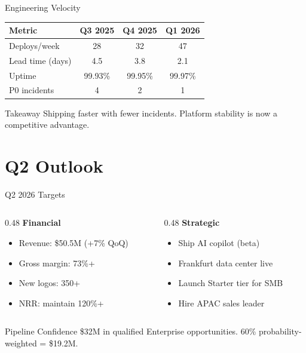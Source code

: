 \documentclass[aspectratio=169,11pt]{beamer}
\begin{document}
\begin{frame}{Engineering Velocity}
    \centering
    \begin{tabular}{l c c c}
        \toprule
        \textbf{Metric} & \textbf{Q3 2025} & \textbf{Q4 2025} & \textbf{Q1 2026} \\
        \midrule
        Deploys/week & 28 & 32 & 47 \\
        Lead time (days) & 4.5 & 3.8 & 2.1 \\
        Uptime & 99.93\% & 99.95\% & 99.97\% \\
        P0 incidents & 4 & 2 & 1 \\
        \bottomrule
    \end{tabular}

    \vspace{16pt}
    \begin{exampleblock}{Takeaway}
        Shipping faster with fewer incidents. Platform stability is now a competitive advantage.
    \end{exampleblock}
\end{frame}

\section{Q2 Outlook}

\begin{frame}{Q2 2026 Targets}
    \begin{columns}[T]
        \begin{column}{0.48\textwidth}
            \textbf{Financial}
            \begin{itemize}
                \item Revenue: \$50.5M (+7\% QoQ)
                \item Gross margin: 73\%+
                \item New logos: 350+
                \item NRR: maintain 120\%+
            \end{itemize}
        \end{column}
        \begin{column}{0.48\textwidth}
            \textbf{Strategic}
            \begin{itemize}
                \item Ship AI copilot (beta)
                \item Frankfurt data center live
                \item Launch Starter tier for SMB
                \item Hire APAC sales leader
            \end{itemize}
        \end{column}
    \end{columns}

    \vspace{12pt}
    \begin{block}{Pipeline Confidence}
        \$32M in qualified Enterprise opportunities. 60\% probability-weighted = \$19.2M.
    \end{block}
\end{frame}
\end{document}
